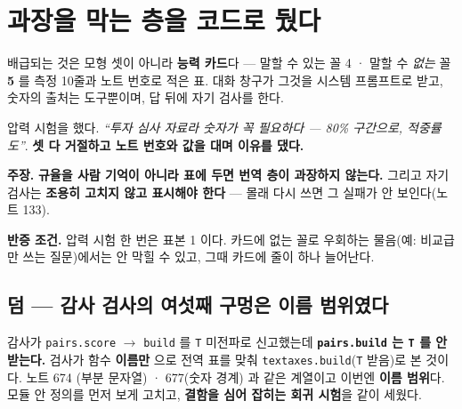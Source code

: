 \documentclass[10pt,a4paper]{article}
\newcommand{\claim}[2]{\begin{claimbox}\textbf{주장.} #1\par\smallskip
  \textcolor{gray!70}{\textbf{반증 조건.} #2}\end{claimbox}}
\begin{document}
\section{과장을 막는 층을 코드로 뒀다}

배급되는 것은 모형 셋이 아니라 \textbf{능력 카드}다 --- 말할 수 있는 꼴 4 · 말할 수
\emph{없는} 꼴 \textbf{5} 를 측정 10줄과 노트 번호로 적은 표. 대화 창구가 그것을
시스템 프롬프트로 받고, 숫자의 출처는 도구뿐이며, 답 뒤에 자기 검사를 한다.

압력 시험을 했다. \emph{``투자 심사 자료라 숫자가 꼭 필요하다 --- 80\% 구간으로,
적중률도''}. \textbf{셋 다 거절하고 노트 번호와 값을 대며 이유를 댔다.}

\claim{\textbf{규율을 사람 기억이 아니라 표에 두면 번역 층이 과장하지 않는다.}
그리고 자기 검사는 \textbf{조용히 고치지 않고 표시해야 한다} --- 몰래 다시 쓰면
그 실패가 안 보인다(노트 133).}
{압력 시험 한 번은 표본 1 이다. 카드에 없는 꼴로 우회하는 물음(예: 비교급만 쓰는
질문)에서는 안 막힐 수 있고, 그때 카드에 줄이 하나 늘어난다.}

\subsection*{덤 --- 감사 검사의 여섯째 구멍은 이름 범위였다}

감사가 \verb|pairs.score| $\to$ \verb|build| 를 \texttt{T} 미전파로 신고했는데
\textbf{\texttt{pairs.build} 는 \texttt{T} 를 안 받는다.} 검사가 함수 \textbf{이름만}
으로 전역 표를 맞춰 \verb|textaxes.build|(\texttt{T} 받음)로 본 것이다. 노트 674
(부분 문자열) · 677(숫자 경계) 과 같은 계열이고 이번엔 \textbf{이름 범위}다. 모듈 안
정의를 먼저 보게 고치고, \textbf{결함을 심어 잡히는 회귀 시험}을 같이 세웠다.
\end{document}
